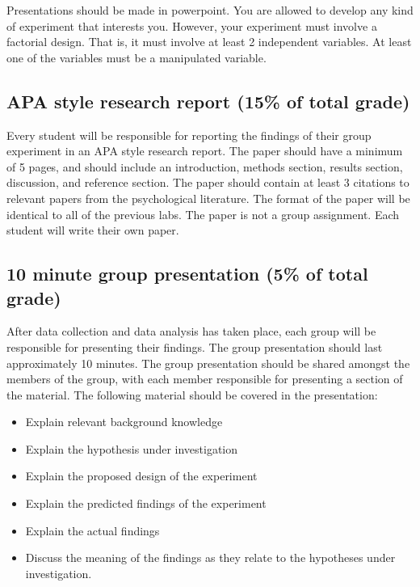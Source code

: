 Presentations should be made in powerpoint. You are allowed to develop any kind of experiment that interests you. However, your experiment must involve a factorial design. That is, it must involve at least 2 independent variables. At least one of the variables must be a manipulated variable.

\subsection{APA style research report (15\% of total grade)}

Every student will be responsible for reporting the findings of their group experiment in an APA style research report. The paper should have a minimum of 5 pages, and should include an introduction, methods section, results section, discussion, and reference section. The paper should contain at least 3 citations to relevant papers from the psychological literature. The format of the paper will be identical to all of the previous labs. The paper is not a group assignment. Each student will write their own paper.

\subsection{10 minute group presentation (5\% of total grade)}

After data collection and data analysis has taken place, each group will be responsible for presenting their findings. The group presentation should last approximately 10 minutes. The group presentation should be shared amongst the members of the group, with each member responsible for presenting a section of the material. The following material should be covered in the presentation:

\begin{itemize}
\item Explain relevant background knowledge
\item Explain the hypothesis under investigation
\item Explain the proposed design of the experiment
\item Explain the predicted findings of the experiment
\item Explain the actual findings
\item Discuss the meaning of the findings as they relate to the hypotheses under investigation.
\end{itemize}